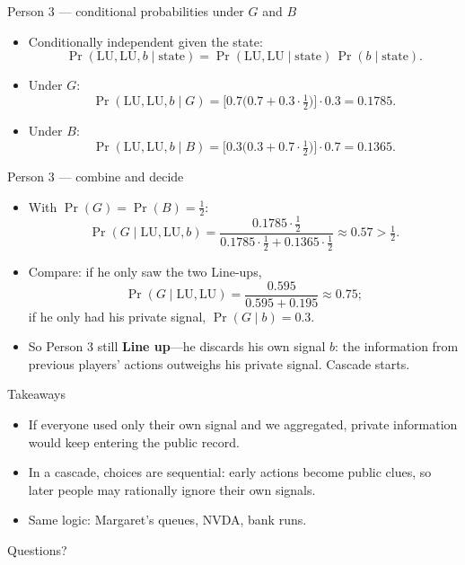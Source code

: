 \documentclass[aspectratio=169,11pt]{beamer}
\begin{document}
\begin{frame}{Person 3 --- conditional probabilities under $G$ and $B$}
\begin{itemize}
  \item Conditionally independent given the state:
  \[
  \Pr(\mathrm{LU},\mathrm{LU},b\mid \text{state})
  =
  \Pr(\mathrm{LU},\mathrm{LU}\mid \text{state})\,\Pr(b\mid \text{state}).
  \]
  \item Under $G$:
  \[
  \Pr(\mathrm{LU},\mathrm{LU},b\mid G)
  =
  \bigl[0.7\bigl(0.7+0.3\cdot\tfrac12\bigr)\bigr]\cdot 0.3
  =
  0.1785.
  \]
  \item Under $B$:
  \[
  \Pr(\mathrm{LU},\mathrm{LU},b\mid B)
  =
  \bigl[0.3\bigl(0.3+0.7\cdot\tfrac12\bigr)\bigr]\cdot 0.7
  =
  0.1365.
  \]
\end{itemize}
\end{frame}

\begin{frame}{Person 3 --- combine and decide}
\begin{itemize}
  \item With $\Pr(G)=\Pr(B)=\tfrac12$:
  \[
  \Pr(G\mid \mathrm{LU},\mathrm{LU},b)
  =
  \frac{0.1785\cdot\tfrac12}{0.1785\cdot\tfrac12+0.1365\cdot\tfrac12}
  \approx 0.57 > \tfrac12.
  \]
  \item Compare: if he only saw the two Line-ups,
  \[
  \Pr(G\mid \mathrm{LU},\mathrm{LU})
  =
  \frac{0.595}{0.595+0.195}
  \approx 0.75;
  \]
  if he only had his private signal, $\Pr(G\mid b)=0.3$.
  \item So Person 3 still \textbf{Line up}---he discards his own signal $b$: the information from previous players' actions outweighs his private signal. Cascade starts.
\end{itemize}
\end{frame}

\begin{frame}{Takeaways}
\begin{itemize}
  \item If everyone used only their own signal and we aggregated, private information would keep entering the public record.
  \item In a cascade, choices are sequential: early actions become public clues, so later people may rationally ignore their own signals.
  \item Same logic: Margaret's queues, NVDA, bank runs.
\end{itemize}
\vspace{0.4em}
\begin{center}
\large Questions?
\end{center}
\end{frame}
\end{document}
